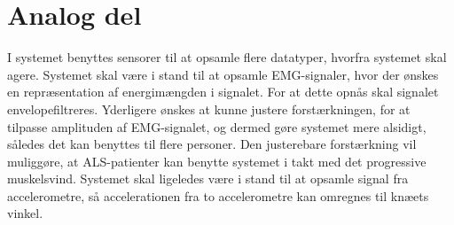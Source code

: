 \section{Analog del}
I systemet benyttes sensorer til at opsamle flere datatyper, hvorfra systemet skal agere. Systemet skal være i stand til at opsamle EMG-signaler, hvor der ønskes en repræsentation af energimængden i signalet. For at dette opnås skal signalet envelopefiltreres. Yderligere ønskes at kunne justere forstærkningen, for at tilpasse amplituden af EMG-signalet, og dermed gøre systemet mere alsidigt, således det kan benyttes til flere personer. Den justerebare forstærkning vil muliggøre, at ALS-patienter kan benytte systemet i takt med det progressive muskelsvind.
Systemet skal ligeledes være i stand til at opsamle signal fra accelerometre, så accelerationen fra to accelerometre kan omregnes til knæets vinkel.